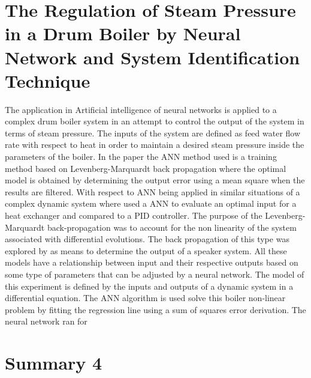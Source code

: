 \documentclass[12pt]{article} %
\begin{document}
\newpage


\section{The Regulation of Steam Pressure in a Drum Boiler by Neural Network and System Identification Technique} %
The application in Artificial intelligence of neural networks is applied to a complex drum boiler system in an attempt to control the output of the system in terms of steam pressure. The inputs of the system are defined as feed water flow rate with respect to heat in order to maintain a desired steam pressure inside the parameters of the boiler. In the paper the ANN method used is a training method based on Levenberg-Marquardt back propagation where the optimal model is obtained by determining the output error using a mean square when the results are filtered. With respect to ANN being applied in similar situations of a complex dynamic system where \cite{Vasickaninova} used a ANN to evaluate an optimal input for a heat exchanger and compared to a PID controller. The purpose of the Levenberg-Marquardt back-propagation was to account for the non linearity of the system associated with differential evolutions. The back propagation of this type was explored by \cite{wu} as means to determine the output of a speaker system. All these models have a relationship between input and their respective outputs based on some type of parameters that can be adjusted by a neural network. The model of this experiment is defined by the inputs and outputs of a dynamic system in a differential equation. The ANN algorithm is used solve this boiler non-linear problem by fitting the regression line using a sum of squares error derivation. The neural network ran for   
\section{Summary 4} %
\end{document}
